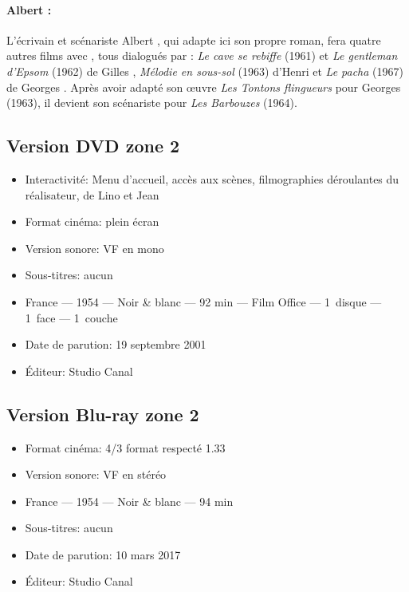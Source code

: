\paragraph{Albert :} L'écrivain et scénariste Albert , qui adapte ici son propre roman, fera quatre autres films avec , tous dialogués par : \emph{Le cave se rebiffe} (1961) et \emph{Le gentleman d'Epsom} (1962) de Gilles , \emph{Mélodie en sous-sol} (1963) d'Henri  et \emph{Le pacha} (1967) de Georges . Après avoir adapté son \oe uvre \emph{Les Tontons flingueurs} pour Georges  (1963), il devient son scénariste pour \emph{Les Barbouzes} (1964).


\subsection*{Version DVD zone 2}

\begin{itemize}
	\item Interactivité: Menu d'accueil, accès aux scènes, filmographies déroulantes du réalisateur, de Lino  et Jean 
	\item Format cinéma: plein écran
	\item Version sonore: VF en mono
	\item Sous-titres: aucun
	\item France --- 1954 --- Noir \& blanc --- 92 min --- Film Office --- 1~disque --- 1~face --- 1~couche
	\item Date de parution: 19 septembre 2001
	\item Éditeur: Studio Canal
\end{itemize}

\subsection*{Version Blu-ray zone 2}

\begin{itemize}
	\item Format cinéma: 4/3 format respecté 1.33
	\item Version sonore: VF en stéréo
	\item France --- 1954 --- Noir \& blanc --- 94 min
	\item Sous-titres: aucun
	\item Date de parution: 10 mars 2017
	\item Éditeur: Studio Canal
\end{itemize}

